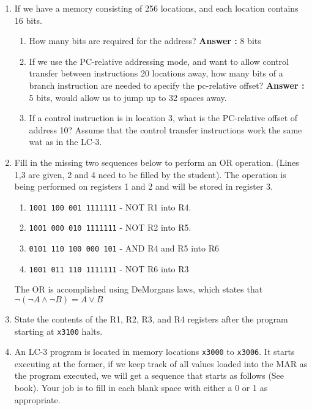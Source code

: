 \documentclass[a4paper,11pt]{article}
\newcommand{\answer}{\textbf{Answer : }}
\begin{document}
\begin{enumerate}
\item If we have a memory consisting of 256 locations, and each location contains 16 bits.
  \begin{enumerate}
  \item How many bits are required for the address? \answer 8 bits
  \item If we use the PC-relative addressing mode, and want to allow control transfer between instructions 20 locations away, how many bits of a branch instruction are needed to specify the pc-relative offset? \answer 5 bits, would allow us to jump up to 32 spaces away.
  \item If a control instruction is in location 3, what is the PC-relative offset of address 10? Assume that the control transfer instructions work the same wat as in the LC-3.
  \end{enumerate}

\item Fill in the missing two sequences below to perform an OR operation. (Lines 1,3 are given, 2 and 4 need to be filled by the student). The operation is being performed on registers 1 and 2 and will be stored in register 3.
\begin{enumerate}
\item \texttt{1001 100 001 1111111} - NOT R1 into R4.
\item \texttt{1001 000 010 1111111} - NOT R2 into R5.
\item \texttt{0101 110 100 000 101} - AND R4 and R5 into R6
\item \texttt{1001 011 110 1111111} - NOT R6 into R3
\end{enumerate}

The OR is accomplished using DeMorgans laws, which states that $\neg(\neg A \wedge \neg B) = A \vee B$

\item State the contents of the R1, R2, R3, and R4 registers after the program starting at \texttt{x3100} halts.

\item An LC-3 program is located in memory locations \texttt{x3000} to \texttt{x3006}. It starts executing at the former, if we keep track of all values loaded into the MAR as the program executed, we will get a sequence that starts as follows (See book). Your job is to fill in each blank space with either a 0 or 1 as appropriate.


\end{enumerate}
\end{document}

